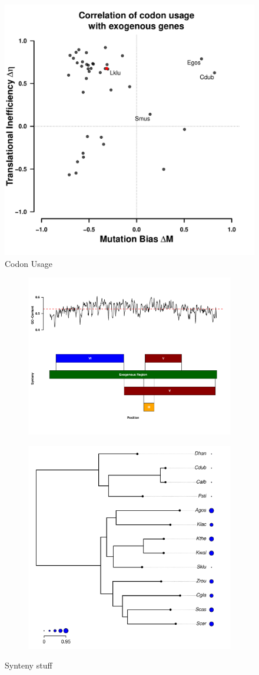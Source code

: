 \documentclass[12pt]{article}
\begin{document}
\begin{figure}[H]
     \centering
	\includegraphics[width=\textwidth]{img/csp_correlations.pdf}
	\caption{Codon Usage}
	\label{fig:corr_all_species}
\end{figure}


\begin{figure}[H]
    \centering
    \begin{subfigure}
        \centering
        \includegraphics[width=.45\textwidth]{img/synteny_blocks_and_gc.pdf}
    \end{subfigure}
    \begin{subfigure}
        \centering
        \includegraphics[width=.45\textwidth]{img/synteny_coverage.pdf}
    \end{subfigure}
    \caption{Synteny stuff}
    \label{fig:synteny_species}
\end{figure}
\end{document}
